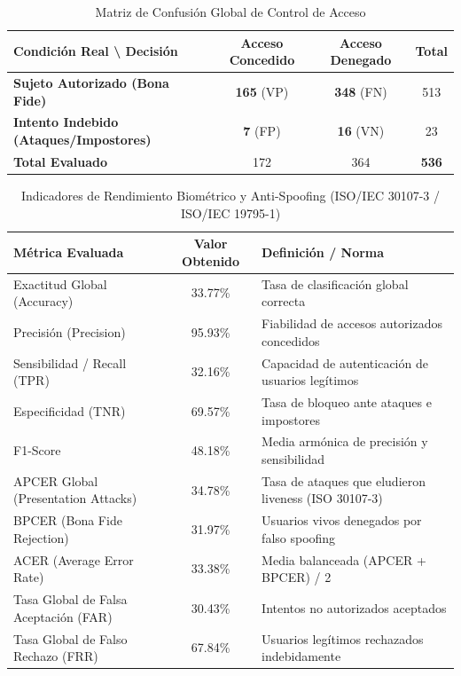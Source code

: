 
\begin{table}[htbp]
\centering
\caption{Matriz de Confusión Global de Control de Acceso}
\label{tab:matriz_confusion}
\begin{tabular}{l|c|c|c}
\hline
\textbf{Condición Real \textbackslash{} Decisión} & \textbf{Acceso Concedido} & \textbf{Acceso Denegado} & \textbf{Total} \\ \hline
\textbf{Sujeto Autorizado (Bona Fide)} & \textbf{165} (VP) & \textbf{348} (FN) & 513 \\ \hline
\textbf{Intento Indebido (Ataques/Impostores)} & \textbf{7} (FP) & \textbf{16} (VN) & 23 \\ \hline
\textbf{Total Evaluado} & 172 & 364 & \textbf{536} \\ \hline
\end{tabular}
\end{table}

\begin{table}[htbp]
\centering
\caption{Indicadores de Rendimiento Biométrico y Anti-Spoofing (ISO/IEC 30107-3 / ISO/IEC 19795-1)}
\label{tab:metricas_biometricas}
\begin{tabular}{l|c|l}
\hline
\textbf{Métrica Evaluada} & \textbf{Valor Obtenido} & \textbf{Definición / Norma} \\ \hline
Exactitud Global (Accuracy) & 33.77\% & Tasa de clasificación global correcta \\
Precisión (Precision) & 95.93\% & Fiabilidad de accesos autorizados concedidos \\
Sensibilidad / Recall (TPR) & 32.16\% & Capacidad de autenticación de usuarios legítimos \\
Especificidad (TNR) & 69.57\% & Tasa de bloqueo ante ataques e impostores \\
F1-Score & 48.18\% & Media armónica de precisión y sensibilidad \\
APCER Global (Presentation Attacks) & 34.78\% & Tasa de ataques que eludieron liveness (ISO 30107-3) \\
BPCER (Bona Fide Rejection) & 31.97\% & Usuarios vivos denegados por falso spoofing \\
ACER (Average Error Rate) & 33.38\% & Media balanceada (APCER + BPCER) / 2 \\
Tasa Global de Falsa Aceptación (FAR) & 30.43\% & Intentos no autorizados aceptados \\
Tasa Global de Falso Rechazo (FRR) & 67.84\% & Usuarios legítimos rechazados indebidamente \\ \hline
\end{tabular}
\end{table}

